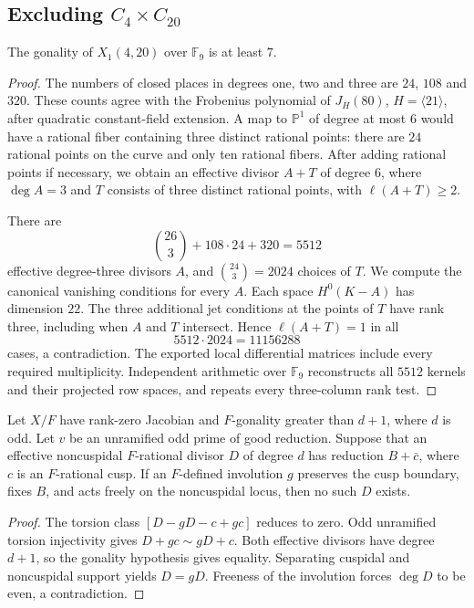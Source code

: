 \subsection{Excluding \texorpdfstring{$C_4\times C_{20}$}{C4 x C20}}
\begin{lemma}\label{lem:decic420-gonality}
The gonality of $X_1(4,20)$ over $\mathbb F_9$ is at least $7$.
\end{lemma}
\begin{proof}
The numbers of closed places in degrees one, two and three are
$24$, $108$ and $320$. These counts agree with the Frobenius
polynomial of $J_H(80)$, $H=\langle21\rangle$, after quadratic
constant-field extension.
A map to $\mathbb P^1$ of degree at most $6$ would have a rational
fiber containing three distinct rational points: there are $24$
rational points on the curve and only ten rational fibers.
After adding rational points if necessary, we obtain an effective
divisor $A+T$ of degree $6$, where $\deg A=3$ and $T$ consists
of three distinct rational points, with $\ell(A+T)\ge2$.

There are
\[
 \binom{26}{3}+108\cdot24+320=5512
\]
effective degree-three divisors $A$, and $\binom{24}{3}=2024$
choices of $T$. We compute the canonical vanishing conditions
for every $A$. Each space $H^0(K-A)$ has dimension $22$.
The three additional jet conditions at the points of $T$ have
rank three, including when $A$ and $T$ intersect. Hence
$\ell(A+T)=1$ in all
\[
 5512\cdot2024=11156288
\]
cases, a contradiction.
The exported local differential matrices include every required
multiplicity. Independent arithmetic over $\mathbb F_9$
reconstructs all $5512$ kernels and their projected row spaces,
and repeats every three-column rank test.
\end{proof}

\begin{lemma}\label{lem:decic-cusp-correction}
Let $X/F$ have rank-zero Jacobian and $F$-gonality greater than
$d+1$, where $d$ is odd. Let $v$ be an unramified odd prime
of good reduction. Suppose that an effective noncuspidal
$F$-rational divisor $D$ of degree $d$ has reduction $B+\bar c$,
where $c$ is an $F$-rational cusp. If an $F$-defined involution
$g$ preserves the cusp boundary, fixes $B$, and acts freely on
the noncuspidal locus, then no such $D$ exists.
\end{lemma}
\begin{proof}
The torsion class $[D-gD-c+gc]$ reduces to zero. Odd unramified
torsion injectivity gives $D+gc\sim gD+c$.
Both effective divisors have degree $d+1$, so the gonality
hypothesis gives equality. Separating cuspidal and noncuspidal
support yields $D=gD$. Freeness of the involution forces
$\deg D$ to be even, a contradiction.
\end{proof}


